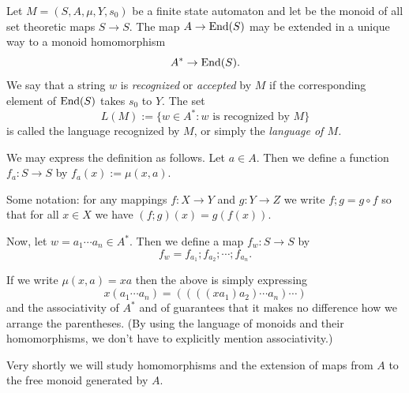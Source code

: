 \begin{defns} Let $M = (S,A,\mu,Y,s_0)$ be a finite state automaton
    and let  be the monoid of all set theoretic maps
    $S\rightarrow S$. The map $A\rightarrow \mathrm{End}(S)$ may be extended
    in a unique way to a monoid homomorphism \[A^* \rightarrow
    \mathrm{End}(S).\] We say that a string $w$ is \emph{recognized} or
    \emph{accepted} by $M$ if the corresponding element of $\mathrm{End}(S)$ takes
    $s_0$ to $Y$. The set \[L(M) := \{w \in A^* : w \text{ is recognized
    by } M\}\] is called the language recognized by $M$, or simply the
    \emph{language of $M$. }
\end{defns}

\begin{rem} We may express the definition as follows. Let $a\in A$.
    Then we define a function $f_a : S\rightarrow S$ by $f_a(x) :=
    \mu(x,a).$

    Some notation: for any mappings $f: X \rightarrow Y$ and $g : Y
    \rightarrow Z$ we write $f;g = g \circ f$ so that for all $x\in X$
    we have $(f;g)(x) = g(f(x))$.

    Now, let $w = a_1\cdots a_n \in A^*$. Then we define a map $f_w :
    S \rightarrow S$ by $$f_w = f_{a_1} ; f_{a_2} ; \cdots ;
    f_{a_n}.$$

    If we write $\mu(x,a) = xa$ then the above is simply expressing \[
    x(a_1\cdots a_n) = ( ( ( (x a_1)a_2)\cdots a_n)\cdots) \] and the
    associativity of $A^*$ and of  guarantees that it makes no
    difference how we arrange the parentheses. (By using the language
    of monoids and their homomorphisms, we don't have to explicitly
    mention associativity.)

    Very shortly we will study homomorphisms and the extension of maps
    from $A$ to the free monoid generated by $A$.
\end{rem}

